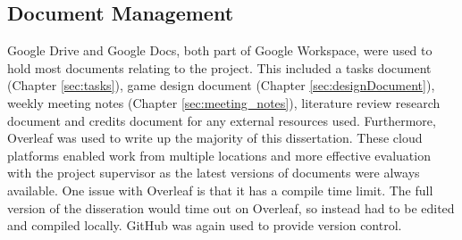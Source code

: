 \subsection{Document Management}
Google Drive and Google Docs, both part of Google Workspace, were used to hold most documents relating to the project. This included a tasks document (Chapter \ref{sec:tasks}), game design document (Chapter \ref{sec:designDocument}), weekly meeting notes (Chapter \ref{sec:meeting_notes}), literature review research document and credits document for any external resources used. Furthermore, Overleaf was used to write up the majority of this dissertation. These cloud platforms enabled work from multiple locations and more effective evaluation with the project supervisor as the latest versions of documents were always available. One issue with Overleaf is that it has a compile time limit. The full version of the disseration would time out on Overleaf, so instead had to be edited and compiled locally. GitHub was again used to provide version control.